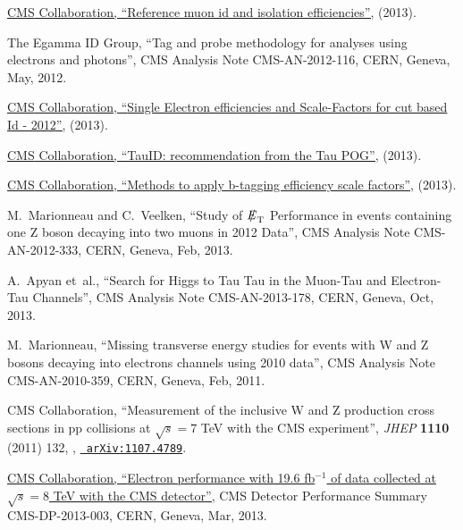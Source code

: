 \documentclass[12pt]{thesis}  %
\def\eslash{\ensuremath{{\hbox{$E$\kern-0.6em\lower-.05ex\hbox{/}\kern0.10em}}}}
\def\met{\mbox{$\eslash_\text{T}$}\xspace} %
\begin{document}
\begin{thebibliography}{100}
\href {https://twiki.cern.ch/twiki/bin/viewauth/CMS/MuonReferenceEffs} {{ CMS}
  Collaboration, ``Reference muon id and isolation efficiencies'',} (2013).

\hrefCMSnoop {} {{The Egamma ID Group}, ``Tag and probe methodology for
  analyses using electrons and photons'',} CMS Analysis Note CMS-AN-2012-116,
  CERN, Geneva, May, 2012.

\href {https://twiki.cern.ch/twiki/bin/view/Main/EGammaScaleFactors2012} {{
  CMS} Collaboration, ``{Single Electron efficiencies and Scale-Factors for cut
  based Id - 2012}'',} (2013).

\href {https://twiki.cern.ch/twiki/bin/viewauth/CMS/TauIDRecommendation} {{
  CMS} Collaboration, ``TauID: recommendation from the Tau POG'',} (2013).

\href {https://twiki.cern.ch/twiki/bin/viewauth/CMS/BTagSFMethods} {{ CMS}
  Collaboration, ``Methods to apply b-tagging efficiency scale factors'',}
  (2013).

\hrefCMSnoop {} {M.~Marionneau and C.~Veelken, ``Study of \met Performance in
  events containing one Z boson decaying into two muons in 2012 Data'',} CMS
  Analysis Note CMS-AN-2012-333, CERN, Geneva, Feb, 2013.

A.~Apyan\hrefCMSnoop {} { {et~al.}, ``Search for Higgs to Tau Tau in the
  Muon-Tau and Electron-Tau Channels'',} CMS Analysis Note CMS-AN-2013-178,
  CERN, Geneva, Oct, 2013.

\hrefCMSnoop {} {M.~Marionneau, ``Missing transverse energy studies for events
  with W and Z bosons decaying into electrons channels using 2010 data'',} CMS
  Analysis Note CMS-AN-2010-359, CERN, Geneva, Feb, 2011.

\hrefCMSnoop {} {{ CMS} Collaboration, ``{Measurement of the inclusive W and Z
  production cross sections in pp collisions at $\sqrt{s}=7$ TeV with the CMS
  experiment}'',} \textit{ JHEP} \textbf{ 1110} (2011) 132,
  \href{http://dx.doi.org/10.1007/JHEP10(2011)132}{},
\href{http://www.arXiv.org/abs/1107.4789}{\texttt{ arXiv:1107.4789}}.

\href {https://cds.cern.ch/record/1523273} {{ CMS} Collaboration, ``{Electron
  performance with 19.6 fb$^{-1}$ of data collected at $\sqrt{s} = 8$ TeV with
  the CMS detector}'',} CMS Detector Performance Summary CMS-DP-2013-003, CERN,
  Geneva, Mar, 2013.


\end{thebibliography}
\end{document}
